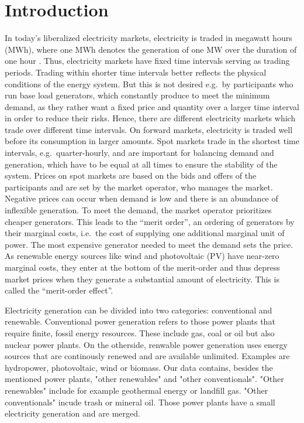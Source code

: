 \documentclass{article}
\begin{document}
\section{Introduction}
In today's liberalized electricity markets, electricity is traded in megawatt hours (MWh), where one MWh denotes the generation of one MW over the duration of one hour \citep{markets_for_electrical_energy}.
Thus, electricity markets have fixed time intervals serving as trading periods.
Trading within shorter time intervals better reflects the physical conditions of the energy system.
But this is not desired e.g.\ by participants who run base load generators, which constantly produce to meet the minimum demand, as they rather want a fixed price and quantity over a larger time interval in order to reduce their risks.
Hence, there are different electricity markets which trade over different time intervals.
On forward markets, electricity is traded well before its consumption in larger amounts.
Spot markets trade in the shortest time intervals, e.g.\ quarter-hourly, and are important for balancing demand and generation, which have to be equal at all times to ensure the stability of the system.
Prices on spot markets are based on the bids and offers of the participants and are set by the market operator, who manages the market.
Negative prices can occur when demand is low and there is an abundance of inflexible generation.
To meet the demand, the market operator prioritizes cheaper generators.
This leads to the \enquote{merit order}, an ordering of generators by their marginal costs, i.e.\ the cost of supplying one additional marginal unit of power.
The most expensive generator needed to meet the demand sets the price.
As renewable energy sources like wind and photovoltaic (PV) have near-zero marginal costs, they enter at the bottom of the merit-order and thus depress market prices when they generate a substantial amount of electricity.
This is called the \enquote{merit-order effect}.

Electricity generation can be divided into two categories: conventional and renewable. Conventional power generation refers to those power plants that require finite, fossil energy resources. These include gas, coal or oil but also nuclear power plants. On the otherside, renwable power generation uses energy sources that are continously renewed and are available unlimited. Examples are hydropower, photovoltaic, wind or biomass. Our data contains, besides the mentioned power plants, "other renewables" and "other conventionals". "Other renewables" include for example geothermal energy or landfill gas. "Other conventionals" incude trash or mineral oil. Those power plants have a small electricity generation and are merged. 
\end{document}
